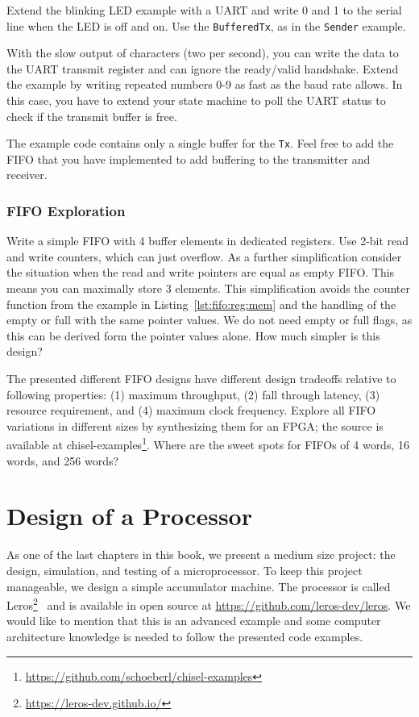 \documentclass[%
    10pt,
    headinclude, footexclude,
    openright, %
    notitlepage,
    cleardoubleempty,
    headsepline,
    pointlessnumbers,
    bibtotoc, idxtotoc,
    ]{scrbook}
\newcommand{\code}[1]{{\small{\texttt{#1}}}}
\newcommand{\myref}[2]{\href{#1}{#2}}
\renewcommand{\myref}[2]{{#2}{\footnote{\url{#1}}}}
\begin{document}
Extend the blinking LED example with a UART and write 0 and 1 to the serial
line when the LED is off and on. Use the \code{BufferedTx}, as in the \code{Sender}
example.

With the slow output of characters (two per second), you can write the data
to the UART transmit register and can ignore the ready/valid handshake.
Extend the example by writing repeated numbers 0-9 as fast as the baud rate allows.
In this case, you have to extend your state machine to poll the UART status
to check if the transmit buffer is free.

The example code contains only a single buffer for the \code{Tx}. Feel free to
add the FIFO that you have implemented to add buffering to the transmitter
and receiver.

\subsection{FIFO Exploration}

Write a simple FIFO with 4 buffer elements in dedicated registers.
Use 2-bit read and write counters, which can just overflow.
As a further simplification consider the situation when the read and write
pointers are equal as empty FIFO. This means you can maximally
store 3 elements. This simplification avoids the counter function from
the example in Listing~\ref{lst:fifo:reg:mem} and the handling
of the empty or full with the same pointer values. We do not need
empty or full flags, as this can be derived form the pointer values
alone. How much simpler is this design?

The presented different FIFO designs have different design tradeoffs
relative to following properties: (1) maximum throughput,
(2) fall through latency, (3) resource requirement, and (4)
maximum clock frequency. Explore all FIFO variations in different sizes by
synthesizing them for an FPGA; the source is available at
\myref{https://github.com/schoeberl/chisel-examples}{chisel-examples}.
Where are the sweet spots for FIFOs of 4 words, 16 words, and 256 words?

\chapter{Design of a Processor}


As one of the last chapters in this book, we present a medium size project:
the design, simulation, and testing of a microprocessor.
To keep this project manageable, we design a simple accumulator machine.
The processor is called \myref{https://leros-dev.github.io/}{Leros}~\cite{leros:arcs2019}
and is available in open source at \url{https://github.com/leros-dev/leros}.
We would like to mention that this is an advanced example and some computer
architecture knowledge is needed to follow the presented code examples.
\end{document}
